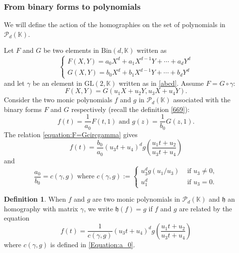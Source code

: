 \documentclass[10pt]{article}
\theoremstyle{definition}
\newtheorem{definition}[theorem]{Definition}
\numberwithin{equation}{section}
\newcommand {\K}{{\mathbb{K}}}
\newcommand{\Bin}{\mathrm {Bin}}
\newcommand{\GL}{\mathrm {GL}}
\begin{document}
 
\subsubsection{From binary forms to polynomials}%
We will define the action of the homographies on the set of polynomials in $\mathcal P_d (\K)$. 



 Let $F$ and $G$ be two elements in $\Bin(d,\K)$ written as  
 \begin{equation}\label{F=G=}
 \begin{cases} F(X,Y) = a_0 X^d + a_1 X^{d-1} Y + \cdots + a_d Y^d
 \\ 
 G(X,Y) = b_0 X^d+ b_1 X^{d-1} Y+ \cdots + b_d Y^d
 \end{cases}
 \end{equation}
 and let $\gamma$ be an element in $\GL(2,\K)$ written as in \eqref{abcd}. Assume
 $F=G\circ\gamma$:
 \begin{equation}\label{equation:F=Gcircgamma}
 F(X,Y)=G(u_1X+u_2Y,u_3X+u_4Y).
 \end{equation}
Consider the two monic polynomials $f$ and $g$ in $\mathcal P_d (\K)$ associated with the binary forms $F$ and $G$ respectively (recall the definition \eqref{669}):
 \[
 f(t)=\frac 1 {a_0} F(t,1) \text{ and } g(z)=\frac 1 {b_0} G(z,1).
 \]
 The relation  \eqref{equation:F=Gcircgamma} gives 
  \[
 f(t)=\frac {b_0}{a_0} (u_3t+u_4)^dg\left( \frac {u_1t+u_2}{u_3t+u_4}\right)
  \]
and 
\begin{equation}\label{Equation:a_0}
 \frac {a_0}{b_0}= c(\gamma,g)
 \text{ where } c(\gamma,g):=\begin{cases}
 u_3^dg(u_1/u_3)&\text{ if $u_3\not=0$},
 \\
 u_1^d&\text{ if $u_3=0$}.
 \end{cases}
\end{equation}

\begin{definition}\label{Definition:h(f)=g}
 When $f$ and $g$ are two monic polynomials in $\mathcal P_d (\K)$ and $\mathfrak h$ an homography with matrix $\gamma$, we write $\mathfrak h(f)=g$ if $f$ and $g$ are related by the equation
 \[%
 f(t)=\frac 1 {c(\gamma,g)}(u_3t+u_4)^dg\left( \frac {u_1t+u_2}{u_3t+u_4}\right)
 \]%
 where $c(\gamma,g)$ is defined in \eqref{Equation:a_0}.
 \end{definition}
 
\end{document}
